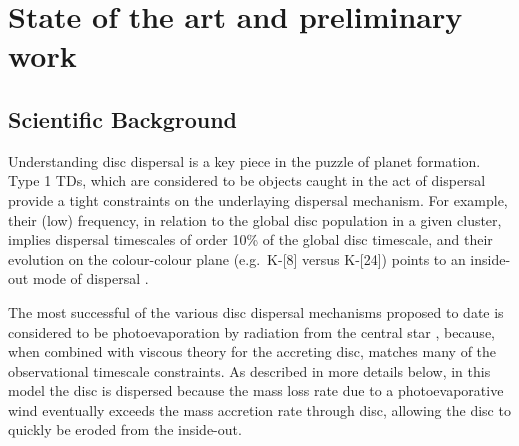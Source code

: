 \documentclass[10pt,fleqn,twoside]{article}
\begin{document}
\section{State of the art and preliminary work}
\renewcommand{\leftmark}{\sc State of the Art and preliminary work}

\subsection{Scientific Background}

Understanding disc dispersal is a key piece in the puzzle of planet
formation. Type 1 TDs, which are considered to be objects caught in
the act of dispersal provide a tight constraints on the underlaying
dispersal mechanism. For example, their (low) frequency, in relation
to the global disc population in a given cluster, implies dispersal
timescales of order 10\% of the global disc timescale, and their
evolution on the colour-colour plane (e.g.\ K-[8] versus K-[24]) points
to an inside-out mode of 
dispersal \citep[e.g.,][]{2011MNRAS.410..671E, 2013MNRAS.428.3327K,
2015MNRAS.452.3689E}.

The most successful of the various disc dispersal mechanisms
proposed to date is considered to be photoevaporation by radiation from the central star
\citep[e.g.,][]{2001MNRAS.328..485C}, 
because, when combined with viscous theory for the accreting disc,
matches many of the observational timescale constraints. 
As described in more details below, in this
model the disc is dispersed because
the mass loss rate due to a photoevaporative wind eventually exceeds the mass accretion
rate through disc, allowing the disc to quickly be eroded from the inside-out.
\end{document}
